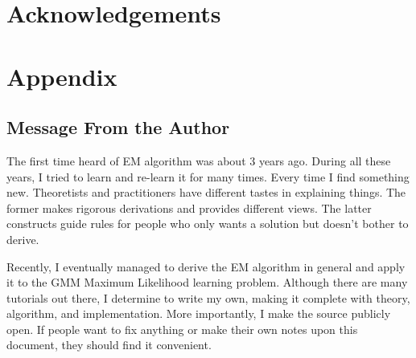 \section*{Acknowledgements}




\section*{Appendix}

\subsection*{Message From the Author}
The first time heard of EM algorithm was about 3 years ago. 
During all these years, I tried to learn and re-learn it 
for many times. Every time I find something new. Theoretists
and practitioners have different tastes in explaining things. 
The former makes rigorous derivations and provides 
different views. The latter constructs guide rules for 
people who only wants a solution but doesn't bother to 
derive. 

Recently, I eventually managed to derive the EM algorithm
in general and apply it to the GMM Maximum Likelihood learning 
problem. Although there are many tutorials out there, 
I determine to write my own, making it complete with 
theory, algorithm, and implementation. More importantly, 
I make the source publicly open. If people want to fix anything
or make their own notes upon this document, they
should find it convenient. 




